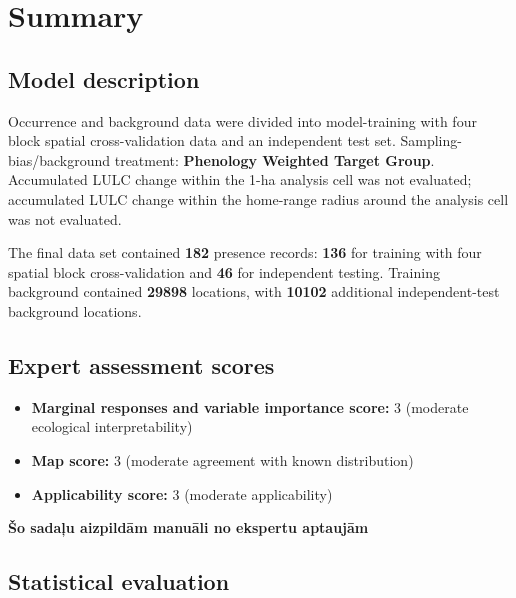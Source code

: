\documentclass[
  openany]{book}
\providecommand{\tightlist}{%
  \setlength{\itemsep}{0pt}\setlength{\parskip}{0pt}}
\providecommand{\tightlist}{%
  \setlength{\itemsep}{0pt}%
  \setlength{\parskip}{0pt}%
}
\begin{document}
\section*{Summary}\label{summary-7}

\subsection*{Model description}\label{model-description-7}

Occurrence and background data were divided into model-training with four block spatial cross-validation data and an independent test set. Sampling-bias/background treatment: \textbf{Phenology Weighted Target Group}. Accumulated LULC change within the 1-ha analysis cell was not evaluated; accumulated LULC change within the home-range radius around the analysis cell was not evaluated.

The final data set contained \textbf{182} presence records: \textbf{136} for training with four spatial block cross-validation and \textbf{46} for independent testing. Training background contained \textbf{29898} locations, with \textbf{10102} additional independent-test background locations.

\subsection*{Expert assessment scores}\label{expert-assessment-scores-7}

\begin{itemize}
\tightlist
\item
  \textbf{Marginal responses and variable importance score:} 3 (moderate ecological interpretability)
\item
  \textbf{Map score:} 3 (moderate agreement with known distribution)
\item
  \textbf{Applicability score:} 3 (moderate applicability)
\end{itemize}

\textbf{Šo sadaļu aizpildām manuāli no ekspertu aptaujām}

\subsection*{Statistical evaluation}\label{statistical-evaluation-7}
\end{document}
